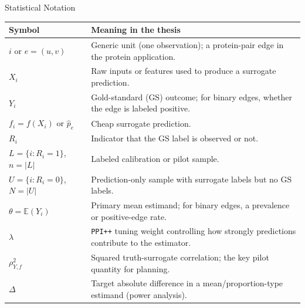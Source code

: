 \documentclass[aspectratio=169,10pt]{beamer}
\newcommand{\PPIPP}{\texttt{PPI++}}
\newcommand{\E}{\mathbb{E}}
\begin{document}
\begin{frame}{Statistical Notation}
\small
\begin{tabularx}{\textwidth}{@{}lX@{}}
\toprule
Symbol & Meaning in the thesis \\
\midrule
\(i\) or \(e=(u,v)\) & Generic unit (one observation); a protein-pair edge in the protein application. \\
\(X_i\) & Raw inputs or features used to produce a surrogate prediction. \\
\(Y_i\) & Gold-standard (GS) outcome; for binary edges, whether the edge is labeled positive. \\
\(f_i=f(X_i)\) or \(\hat p_e\) & Cheap surrogate prediction. \\
\(R_i\) & Indicator that the GS label is observed or not. \\
\(L=\{i:R_i=1\}\), \(n=|L|\) & Labeled calibration or pilot sample. \\
\(U=\{i:R_i=0\}\), \(N=|U|\) & Prediction-only sample with surrogate labels but no GS labels. \\
\(\theta=\E(Y_i)\) & Primary mean estimand; for binary edges, a prevalence or positive-edge rate. \\
\(\lambda\) & \PPIPP{} tuning weight controlling how strongly predictions contribute to the estimator. \\
\(\rho^2_{Y,f}\) & Squared truth-surrogate correlation; the key pilot quantity for planning. \\
\(\Delta\) & Target absolute difference in a mean/proportion-type estimand (power analysis). \\
\bottomrule
\end{tabularx}
\end{frame}
\end{document}
